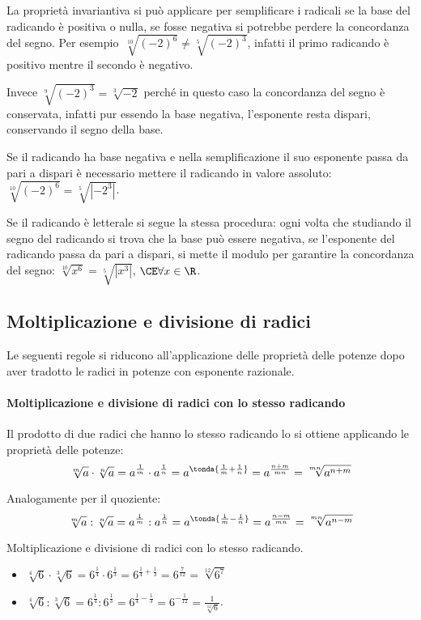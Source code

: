 La proprietà invariantiva si può applicare per semplificare i radicali se 
la base del radicando è positiva o nulla, se fosse negativa si potrebbe 
perdere la concordanza del segno. 
Per esempio~\(\sqrt[10]{(-2)^6}\neq \sqrt[5]{(-2)^3}\), infatti il primo 
radicando è positivo mentre il secondo è negativo.

Invece \(\sqrt[9]{(-2)^3}=\sqrt[3]{-2}\) perché in questo caso la 
concordanza del segno è conservata, infatti pur essendo la base negativa, 
l'esponente resta dispari, conservando il segno della base.

Se il radicando ha base negativa e nella 
semplificazione il suo esponente 
passa da pari a dispari è necessario mettere il radicando in valore 
assoluto: 
\(\sqrt[10]{(-2)^6}=\sqrt[5]{\left|-2^3\right|}\).

Se il radicando è letterale si segue la stessa procedura: ogni volta che 
studiando il segno del radicando si trova che la base può essere 
negativa, se l'esponente del radicando passa da pari a dispari, si mette il 
modulo per garantire la concordanza del segno:
\(\sqrt[10]{x^6}=\sqrt[5]{\left|x^3\right|}\), \(\CE \forall x \in \R\).

\subsection{Moltiplicazione e divisione di radici}

Le seguenti regole si riducono all'applicazione delle proprietà delle 
potenze dopo aver tradotto le radici in potenze con esponente razionale.

\paragraph{Moltiplicazione e divisione di radici con lo stesso radicando}

Il prodotto di due radici che hanno lo stesso 
radicando lo si ottiene applicando le proprietà delle potenze:
\[\sqrt[m]a \cdot \sqrt[n]a=a^\frac{1}{m} \cdot a^\frac{1}{n} =
a^{\tonda{\frac{1}{m} + \frac{1}{n}}}=
a^\frac{n+m}{mn} = \sqrt[mn]{a^{n+m}}\]

Analogamente per il quoziente: 
\[\sqrt[m]a : \sqrt[n]a=a^\frac{1}{m} : a^\frac{1}{n} =
a^{\tonda{\frac{1}{m} -\frac{1}{n}}}=
a^\frac{n-m}{mn} = \sqrt[mn]{a^{n-m}}\]

% 
\begin{esempio}{}{}
Moltiplicazione e divisione di radici con lo stesso radicando.
\begin{itemize}
\item \(\sqrt[4]6 \cdot \sqrt[3]6=6^{\frac 1 4}\cdot 6^{\frac 1 3}=
      6^{\frac 1 4+\frac 1 3}=6^{\frac 7{12}}=\sqrt[12]{6^7}\)
\item \(\sqrt[4]6:\sqrt[3]6=6^{\frac 1 4}:6^{\frac 1 3}=
      6^{\frac 1 4-\frac 1 3}=6^{-\frac 1{12}}=\frac 1{\sqrt[12]6}\).
\end{itemize}
\end{esempio}
% 

